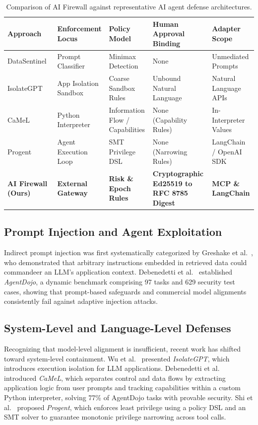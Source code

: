 \documentclass[sigconf,anonymous,review]{acmart}
\begin{document}
\begin{table}[t]
\centering
\caption{Comparison of AI Firewall against representative AI agent defense architectures.}
\label{tab:related_work}
\small
\begin{tabular}{lllll}
\toprule
\textbf{Approach} & \textbf{Enforcement Locus} & \textbf{Policy Model} & \textbf{Human Approval Binding} & \textbf{Adapter Scope} \\
\midrule
DataSentinel~\cite{liu2025datasentinel} & Prompt Classifier & Minimax Detection & None & Unmediated Prompts \\
IsolateGPT~\cite{wu2025isolategpt}     & App Isolation Sandbox & Coarse Sandbox Rules & Unbound Natural Language & Natural Language APIs \\
CaMeL~\cite{debenedetti2025camel}         & Python Interpreter & Information Flow / Capabilities & None (Capability Rules) & In-Interpreter Values \\
Progent~\cite{shi2025progent}             & Agent Execution Loop & SMT Privilege DSL & None (Narrowing Rules) & LangChain / OpenAI SDK \\
\textbf{AI Firewall (Ours)}               & \textbf{External Gateway} & \textbf{Risk \& Epoch Rules} & \textbf{Cryptographic Ed25519 to RFC 8785 Digest} & \textbf{MCP \& LangChain} \\
\bottomrule
\end{tabular}
\end{table}

\subsection{Prompt Injection and Agent Exploitation}
Indirect prompt injection was first systematically categorized by Greshake et al.~\cite{greshake2023not}, who demonstrated that arbitrary instructions embedded in retrieved data could commandeer an LLM's application context. Debenedetti et al.~\cite{debenedetti2024agentdojo} established \emph{AgentDojo}, a dynamic benchmark comprising 97 tasks and 629 security test cases, showing that prompt-based safeguards and commercial model alignments consistently fail against adaptive injection attacks.

\subsection{System-Level and Language-Level Defenses}
Recognizing that model-level alignment is insufficient, recent work has shifted toward system-level containment. Wu et al.~\cite{wu2025isolategpt} presented \emph{IsolateGPT}, which introduces execution isolation for LLM applications. Debenedetti et al.~\cite{debenedetti2025camel} introduced \emph{CaMeL}, which separates control and data flows by extracting application logic from user prompts and tracking capabilities within a custom Python interpreter, solving 77\% of AgentDojo tasks with provable security. Shi et al.~\cite{shi2025progent} proposed \emph{Progent}, which enforces least privilege using a policy DSL and an SMT solver to guarantee monotonic privilege narrowing across tool calls.
\end{document}
